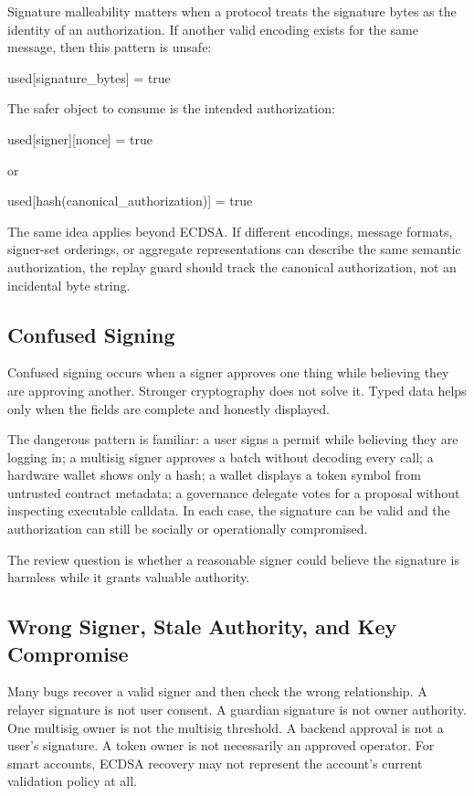 Signature malleability matters when a protocol treats the signature bytes as the identity of an authorization. If another valid encoding exists for the same message, then this pattern is unsafe:

\begin{codeblock}
used[signature_bytes] = true
\end{codeblock}

The safer object to consume is the intended authorization:

\begin{codeblock}
used[signer][nonce] = true

or

used[hash(canonical_authorization)] = true
\end{codeblock}

The same idea applies beyond ECDSA. If different encodings, message formats, signer-set orderings, or aggregate representations can describe the same semantic authorization, the replay guard should track the canonical authorization, not an incidental byte string.

\subsection{Confused Signing}

Confused signing occurs when a signer approves one thing while believing they are approving another. Stronger cryptography does not solve it. Typed data helps only when the fields are complete and honestly displayed.

The dangerous pattern is familiar: a user signs a permit while believing they are logging in; a multisig signer approves a batch without decoding every call; a hardware wallet shows only a hash; a wallet displays a token symbol from untrusted contract metadata; a governance delegate votes for a proposal without inspecting executable calldata. In each case, the signature can be valid and the authorization can still be socially or operationally compromised.

The review question is whether a reasonable signer could believe the signature is harmless while it grants valuable authority.

\subsection{Wrong Signer, Stale Authority, and Key Compromise}

Many bugs recover a valid signer and then check the wrong relationship. A relayer signature is not user consent. A guardian signature is not owner authority. One multisig owner is not the multisig threshold. A backend approval is not a user's signature. A token owner is not necessarily an approved operator. For smart accounts, ECDSA recovery may not represent the account's current validation policy at all.

